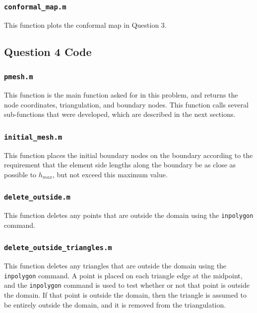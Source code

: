 \documentclass[10pt]{article}
\begin{document}
\subsubsection{{\tt conformal\_map.m}}

This function plots the conformal map in Question 3.



\subsection{Question 4 Code}
\subsubsection{{\tt pmesh.m}}

This function is the main function asked for in this problem, and returns the node coordinates, triangulation, and boundary nodes. This function calls several sub-functions that were developed, which are described in the next sections. 



\subsubsection{{\tt initial\_mesh.m}}

This function places the initial boundary nodes on the boundary according to the requirement that the element side lengths along the boundary be as close as possible to \(h_{max}\), but not exceed this maximum value.



\subsubsection{{\tt delete\_outside.m}}

This function deletes any points that are outside the domain using the {\tt inpolygon} command.



\subsubsection{{\tt delete\_outside\_triangles.m}}

This function deletes any triangles that are outside the domain using the {\tt inpolygon} command. A point is placed on each triangle edge at the midpoint, and the {\tt inpolygon} command is used to test whether or not that point is outside the domain. If that point is outside the domain, then the triangle is assumed to be entirely outside the domain, and it is removed from the triangulation.
\end{document}
